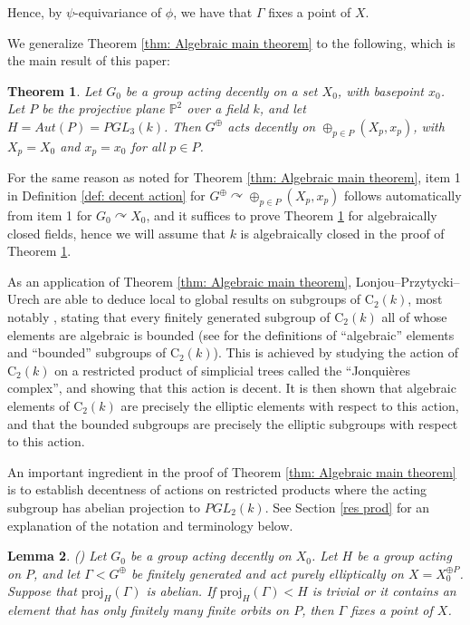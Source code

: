 \documentclass[12pt]{article}
\newtheorem{thm}{Theorem}[section]
\newtheorem{lem}[thm]{Lemma}
\theoremstyle{definition}
\begin{document}
Hence, by $\psi$-equivariance of $\phi$, we have that $\Gamma$ fixes a point of $X$. 


We generalize Theorem \ref{thm: Algebraic main theorem} to the following, which is the main result of this paper: 

\begin{thm}
    \label{thm: main thm}
    Let $G_0$ be a group acting decently on a set $X_0$, with basepoint $x_0$. Let $P$ be the projective plane $\mathbb{P}^2$ over a field $k$, and let $H = Aut(P) = PGL_3(k)$. Then $G^{\oplus}$ acts decently on $\oplus_{p \in P} (X_p, x_p)$, with $X_p = X_0$ and $x_p=x_0$ for all $p \in P$.  
\end{thm}

For the same reason as noted for Theorem \ref{thm: Algebraic main theorem}, item 1 in Definition \ref{def: decent action} for $G^{\oplus} \curvearrowright \oplus_{p \in P} (X_p, x_p)$ follows automatically from item 1 for $G_0 \curvearrowright X_0$, and it suffices to prove Theorem \ref{thm: main thm} for algebraically closed fields, hence we will assume that $k$ is algebraically closed in the proof of Theorem \ref{thm: main thm}. 

As an application of Theorem \ref{thm: Algebraic main theorem}, Lonjou--Przytycki--Urech are able to deduce local to global results on subgroups of $\mathrm{C}_2(k)$, most notably \cite[Theorem 1.1]{Algebraic}, stating that every finitely generated subgroup of $\mathrm{C}_2(k)$ all of whose elements are algebraic is bounded (see \cite{Algebraic} for the definitions of ``algebraic'' elements and ``bounded'' subgroups of $\mathrm{C}_2(k)$). This is achieved by studying the action of $\mathrm{C}_2(k)$ on a restricted product of simplicial trees called the ``Jonqui\`eres complex'', and showing that this action is decent. It is then shown that algebraic elements of $\mathrm{C}_2(k)$ are precisely the elliptic elements with respect to this action, and that the bounded subgroups are precisely the elliptic subgroups with respect to this action. 

An important ingredient in the proof of Theorem \ref{thm: Algebraic main theorem} is to establish decentness of actions on restricted products where the acting subgroup has abelian projection to $PGL_2(k)$. See Section \ref{res prod} for an explanation of the notation and terminology below. 

\begin{lem}(\cite[Lemma 4.7]{Algebraic})
    Let $G_0$ be a group acting decently on $X_0$. Let $H$ be a group acting on $P$, and let $\Gamma < G^{\oplus}$ be finitely generated and act purely elliptically on $X = X_0^{\oplus P}$. Suppose that $\mathrm{proj}_H(\Gamma)$ is abelian. If $\mathrm{proj}_H(\Gamma) < H$ is trivial or it contains an element that has only finitely many finite orbits on $P$, then $\Gamma$ fixes a point of $X$.
\end{lem}
\end{document}
